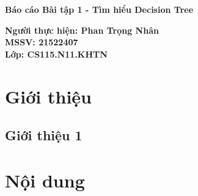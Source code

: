 \documentclass[a4paper,twoside]{article}
\begin{document}
    \thispagestyle{empty}
    \begin{center}
        \LARGE
        \textbf{Báo cáo Bài tập 1 - Tìm hiểu Decision Tree}
        
        \large    
        \vspace{0.4cm}
        \textbf{Người thực hiện: Phan Trọng Nhân\\}
        \textbf{MSSV: 21522407\\}
        \textbf{Lớp: CS115.N11.KHTN\\}
    \end{center}
    \newpage
    \tableofcontents
    \newpage
    \section{Giới thiệu}
    \subsection{Giới thiệu 1}
    \newpage
    \section{Nội dung}
\end{document}
